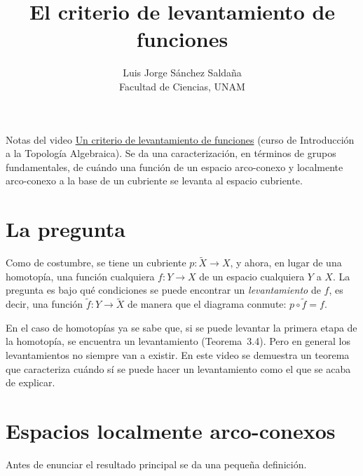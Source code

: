 \documentclass[11pt]{article}
\title{El criterio de levantamiento de funciones}
\author{Luis Jorge Sánchez Saldaña\\[2pt]\small Facultad de Ciencias, UNAM}
\date{}
\begin{document}
\maketitle

\noindent\small Notas del video
\href{https://www.youtube.com/watch?v=LxlUZgf1J6s}{\guillemotleft{}Un criterio de levantamiento de funciones\guillemotright{}}
(curso de Introducción a la Topología Algebraica). Se da una caracterización, en términos de grupos fundamentales, de cuándo una función de un espacio arco-conexo y localmente arco-conexo a la base de un cubriente se levanta al espacio cubriente.
\normalsize

\section*{La pregunta}

Como de costumbre, se tiene un cubriente $p\colon\tilde X\to X$, y ahora, en lugar de una homotopía, una función cualquiera $f\colon Y\to X$ de un espacio cualquiera $Y$ a $X$. La pregunta es bajo qué condiciones se puede encontrar un \emph{levantamiento} de $f$, es decir, una función $\tilde f\colon Y\to\tilde X$ de manera que el diagrama conmute: $p\circ\tilde f=f$.

\begin{center}
\end{center}

En el caso de homotopías ya se sabe que, si se puede levantar la primera etapa de la homotopía, se encuentra un levantamiento (Teorema~3.4). Pero en general los levantamientos no siempre van a existir. En este video se demuestra un teorema que caracteriza cuándo sí se puede hacer un levantamiento como el que se acaba de explicar.

\section*{Espacios localmente arco-conexos}

Antes de enunciar el resultado principal se da una pequeña definición.
\end{document}
